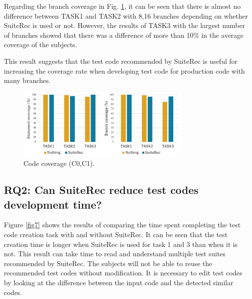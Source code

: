 \documentclass[conference]{IEEEtran}
\begin{document}
Regarding the branch coverage in Fig. \ref{fig5}, it can be seen that there is almost no difference between TASK1 and TASK2 with 8,16 branches depending on whether SuiteRec is used or not. However, the results of TASK3 with the largest number of branches showed that there was a difference of more than 10\% in the average coverage of the subjects.

This result suggests that the test code recommended by SuiteRec is useful for increasing the coverage rate when developing test code for production code with many branches. %


\begin{figure}[htbp]
\centerline{\includegraphics[width=8.5cm]{coverage.pdf}}
\caption{Code coverage (C0,C1).}
\label{fig5}
\end{figure}


\subsection{RQ2: Can SuiteRec reduce test codes development time?}
Figure \ref{fig7} shows the results of comparing the time spent completing the test code creation task with and without SuiteRec. It can be seen that the test creation time is longer when SuiteRec is used for task 1 and 3 than when it is not. This result can take time to read and understand multiple test suites recommended by SuiteRec. The subjects will not be able to reuse the recommended test codes without modification. It is necessary to edit test codes by looking at the difference between the input code and the detected similar codes. %
\end{document}
